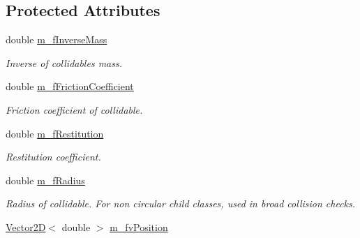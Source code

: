 \subsection*{Protected Attributes}
\begin{DoxyCompactItemize}
\item 
\hypertarget{class_collidable_a7ea7747a2156545d13b4b7f6e06bfe38}{}double \hyperlink{class_collidable_a7ea7747a2156545d13b4b7f6e06bfe38}{m\+\_\+f\+Inverse\+Mass}\label{class_collidable_a7ea7747a2156545d13b4b7f6e06bfe38}

\begin{DoxyCompactList}\small\item\em Inverse of collidable\textquotesingle{}s mass. \end{DoxyCompactList}\item 
\hypertarget{class_collidable_a7d243411e75ff019385dea0a4ff153e9}{}double \hyperlink{class_collidable_a7d243411e75ff019385dea0a4ff153e9}{m\+\_\+f\+Friction\+Coefficient}\label{class_collidable_a7d243411e75ff019385dea0a4ff153e9}

\begin{DoxyCompactList}\small\item\em Friction coefficient of collidable. \end{DoxyCompactList}\item 
\hypertarget{class_collidable_a17a452821ac1a880542e596fbfcaae6a}{}double \hyperlink{class_collidable_a17a452821ac1a880542e596fbfcaae6a}{m\+\_\+f\+Restitution}\label{class_collidable_a17a452821ac1a880542e596fbfcaae6a}

\begin{DoxyCompactList}\small\item\em Restitution coefficient. \end{DoxyCompactList}\item 
\hypertarget{class_collidable_a1dde2844bbacaaf23b8b0652bf5ce906}{}double \hyperlink{class_collidable_a1dde2844bbacaaf23b8b0652bf5ce906}{m\+\_\+f\+Radius}\label{class_collidable_a1dde2844bbacaaf23b8b0652bf5ce906}

\begin{DoxyCompactList}\small\item\em Radius of collidable. For non circular child classes, used in broad collision checks. \end{DoxyCompactList}\item 
\hypertarget{class_collidable_ac72f55f30a447a47bf165ce8d7584027}{}\hyperlink{class_vector2_d}{Vector2\+D}$<$ double $>$ \hyperlink{class_collidable_ac72f55f30a447a47bf165ce8d7584027}{m\+\_\+fv\+Position}\label{class_collidable_ac72f55f30a447a47bf165ce8d7584027}


\end{DoxyCompactItemize}

